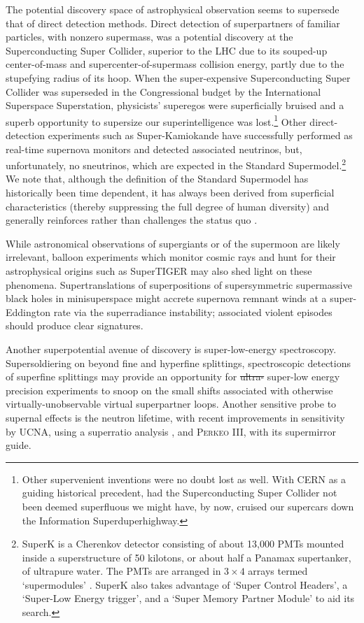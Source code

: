 The potential discovery space of astrophysical observation seems to supersede that of direct detection methods. 
Direct detection of superpartners of familiar particles, with nonzero supermass, was a potential discovery at the Superconducting Super Collider, superior to the LHC due to its souped-up center-of-mass and supercenter-of-supermass collision energy, partly due to the stupefying radius of its hoop.
When the super-expensive Superconducting Super Collider was superseded in the Congressional budget by the International Superspace Superstation, physicists' superegos were superficially bruised and a superb opportunity to supersize our superintelligence was lost.\footnote{
Other supervenient inventions were no doubt lost as well.
With CERN as a guiding historical precedent, had the Superconducting Super Collider not been deemed superfluous we might have, by now, cruised our supercars down the Information Superduperhighway.}
Other direct-detection experiments such as Super-Kamiokande have successfully performed as real-time supernova monitors and detected associated neutrinos, but, unfortunately, no sneutrinos, which are expected in the Standard Supermodel.\footnote{ 
SuperK is a Cherenkov detector consisting of about 13,000 PMTs mounted inside a superstructure of 50 kilotons, or about half a Panamax supertanker, of ultrapure water.  The PMTs are arranged in $3\times4$ arrays termed `supermodules' \cite{Fukuda:2002uc}.
SuperK also takes advantage of `Super Control Headers', a `Super-Low Energy trigger', and a `Super Memory Partner Module' to aid its search.
} We note that, although the definition of the Standard Supermodel has historically been time dependent, it has always been derived from superficial characteristics (thereby suppressing the full degree of human diversity) and generally reinforces rather than challenges the status quo \cite{fashionmodels}.


While astronomical observations of supergiants or of the supermoon are likely irrelevant, balloon experiments which monitor cosmic rays and hunt for their astrophysical origins such as SuperTIGER\cite{Binns:2014xpa} may also shed light on these phenomena.
Supertranslations of superpositions of supersymmetric supermassive black holes in minisuperspace might accrete supernova remnant winds at a super-Eddington rate via the superradiance instability; associated violent episodes should produce clear signatures.

Another superpotential avenue of discovery is super-low-energy spectroscopy.
Supersoldiering on beyond fine and hyperfine splittings, spectroscopic detections of superfine splittings may provide an opportunity for \st{ultra-} super-low energy precision experiments to snoop on the small shifts associated with otherwise virtually-unobservable virtual superpartner loops.
Another sensitive probe to supernal effects is the neutron lifetime, with recent improvements in sensitivity by UCNA, using a superratio analysis \cite{Brown:2017mhw}, and P\textsc{erkeo} III, with its supermirror guide\cite{Markisch:2018ndu}.

